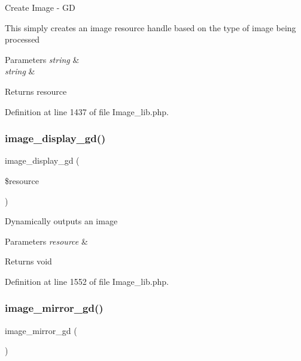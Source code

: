 Create Image -\/ GD

This simply creates an image resource handle based on the type of image being processed


\begin{DoxyParams}{Parameters}
{\em string} & \\
\hline
{\em string} & \\
\hline
\end{DoxyParams}
\begin{DoxyReturn}{Returns}
resource 
\end{DoxyReturn}


Definition at line 1437 of file Image\+\_\+lib.\+php.

\mbox{\label{class_c_i___image__lib_af641d1806701b178dfba3dbf7da54462}} 
\subsubsection{\texorpdfstring{image\_display\_gd()}{image\_display\_gd()}}
{\footnotesize\ttfamily image\+\_\+display\+\_\+gd (\begin{DoxyParamCaption}\item[{}]{\$resource }\end{DoxyParamCaption})}

Dynamically outputs an image


\begin{DoxyParams}{Parameters}
{\em resource} & \\
\hline
\end{DoxyParams}
\begin{DoxyReturn}{Returns}
void 
\end{DoxyReturn}


Definition at line 1552 of file Image\+\_\+lib.\+php.

\mbox{\label{class_c_i___image__lib_a3f6d47ec077726da699890d4644797ad}} 
\subsubsection{\texorpdfstring{image\_mirror\_gd()}{image\_mirror\_gd()}}
{\footnotesize\ttfamily image\+\_\+mirror\+\_\+gd (\begin{DoxyParamCaption}{ }\end{DoxyParamCaption})}

